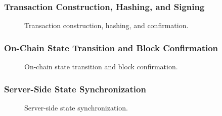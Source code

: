 \subsubsection{Transaction Construction, Hashing, and Signing}
\label{sec:tx-construction-hashing}

\begin{figure}[H]
\centering
{}
\caption[Transaction construction, hashing, and confirmation]{Transaction construction, hashing, and confirmation.}
\label{fig:tx-construction-confirmation}
\end{figure}


\subsubsection{On-Chain State Transition and Block Confirmation}
\label{sec:onchain-state-transition}

\begin{figure}[H]
\centering
{}
\caption[On-chain state transition and block confirmation]{On-chain state transition and block confirmation.}
\label{fig:onchain-state-transition}
\end{figure}


\subsubsection{Server-Side State Synchronization}
\label{sec:server-state-sync}

\begin{figure}[H]
\centering
{}
\caption[Server-side state synchronization]{Server-side state synchronization.}
\label{fig:server-state-synchronization}
\end{figure}

